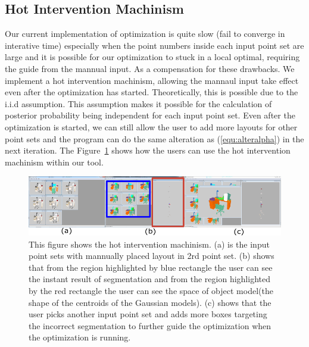 \subsection{Hot Intervention Machinism}
Our current implementation of optimization is quite slow (fail to converge in interative time) especially when the point numbers inside each input point set are large and it is possible for our optimization to stuck in a local optimal, requiring the guide from the mannual input. As a compensation for these drawbacks. We implement a hot intervention machinism, allowing the mannaul input take effect even after the optimization has started. Theoretically, this is possible due to the i.i.d assumption. 
This assumption makes it possible for the calculation of posterior probability being independent for each input point set. Even after the optimization is started, we can still allow the user to add more layouts for other point sets and the program can do the same alteration as (\ref{equ:alteralpha}) in the next iteration. The Figure~\ref{fig:hi} shows how the users can use the hot intervention machinism within our tool.
\begin{figure}[htb]
	\centering
	\includegraphics[width=\linewidth]{images/hotintervention/hi}
	\caption{\label{fig:hi}This figure shows the hot intervention machinism. (a) is the input point sets with mannually placed layout in 2rd point set. (b) shows that from the region highlighted by blue rectangle the user can see the instant result of segmentation and from the region highlighted by the red rectangle the user can see the space of object model(the shape of the centroids of the Gaussian models). (c) shows that the user picks another input point set and adds more boxes targeting the incorrect segmentation to further guide the optimization when the optimization is running.}
\end{figure}
 